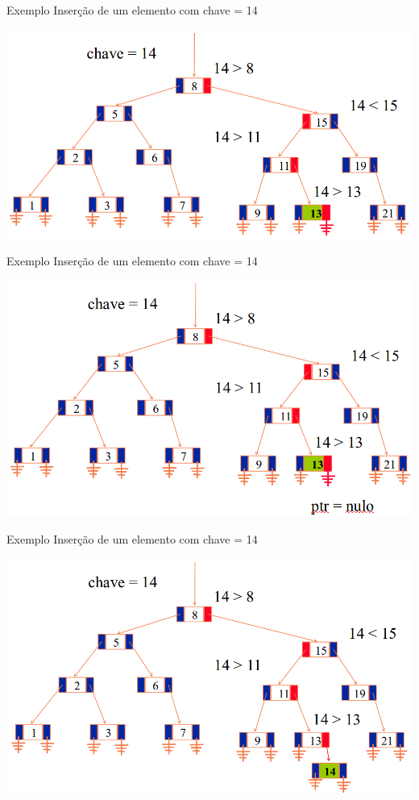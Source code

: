 \documentclass[12pt,table,xcolor={dvipsnames}]{beamer}
\begin{document}
\begin{frame}[fragile]{Exemplo}
Inserção de um elemento com chave = 14
\begin{center}
\includegraphics[scale=.3]{arv5.png} 
\end{center}
\end{frame}

\begin{frame}[fragile]{Exemplo}
Inserção de um elemento com chave = 14
\begin{center}
\includegraphics[scale=.3]{arv6.png} 
\end{center}
\end{frame}

\begin{frame}[fragile]{Exemplo}
Inserção de um elemento com chave = 14
\begin{center}
\includegraphics[scale=.3]{arv7.png} 
\end{center}
\end{frame}
\end{document}

